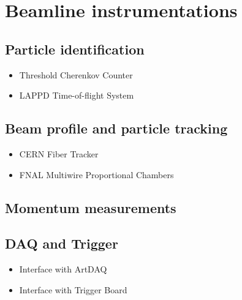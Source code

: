 \section{Beamline instrumentations}
\label{sec:beaminstruments}

\subsection{Particle identification}

\begin{itemize}
\item Threshold Cherenkov Counter
\item LAPPD Time-of-flight System
\end{itemize}

\subsection{Beam profile and particle tracking}

\begin{itemize}
\item CERN Fiber Tracker
\item FNAL Multiwire Proportional Chambers
\end{itemize}

\subsection{Momentum measurements}

\subsection{DAQ and Trigger}

\begin{itemize}
\item Interface with ArtDAQ
\item Interface with Trigger Board
\end{itemize}




